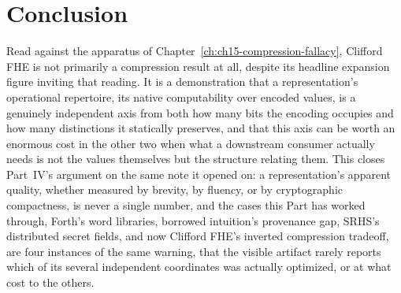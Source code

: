 \section{Conclusion}

Read against the apparatus of Chapter~\ref{ch:ch15-compression-fallacy}, Clifford FHE is not primarily a compression result at all, despite its headline expansion figure inviting that reading. It is a demonstration that a representation's operational repertoire, its native computability over encoded values, is a genuinely independent axis from both how many bits the encoding occupies and how many distinctions it statically preserves, and that this axis can be worth an enormous cost in the other two when what a downstream consumer actually needs is not the values themselves but the structure relating them. This closes Part~IV's argument on the same note it opened on: a representation's apparent quality, whether measured by brevity, by fluency, or by cryptographic compactness, is never a single number, and the cases this Part has worked through, Forth's word libraries, borrowed intuition's provenance gap, SRHS's distributed secret fields, and now Clifford FHE's inverted compression tradeoff, are four instances of the same warning, that the visible artifact rarely reports which of its several independent coordinates was actually optimized, or at what cost to the others.
